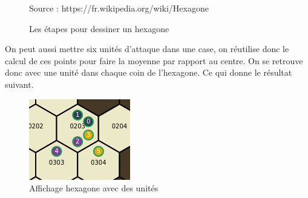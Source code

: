 \begin{figure}[H]
    \centering
    \def\stackalignment{r}
    {\scriptsize%
        Source : https://fr.wikipedia.org/wiki/Hexagone}
    \caption{Les étapes pour dessiner un hexagone}
    \label{fig:hexagon}
\end{figure}

On peut aussi mettre six unités d'attaque dans une case, on réutilise donc le calcul de ces points pour faire la moyenne par rapport au centre. On se retrouve donc avec une unité dans chaque coin de l'hexagone. Ce qui donne le résultat suivant.

\begin{figure}[H]
    \centering
    \includegraphics[scale=.7]{data/hexagon_with_units.png}
    \caption{Affichage hexagone avec des unités}
    \label{fig:hexagon_with_units}
\end{figure}
